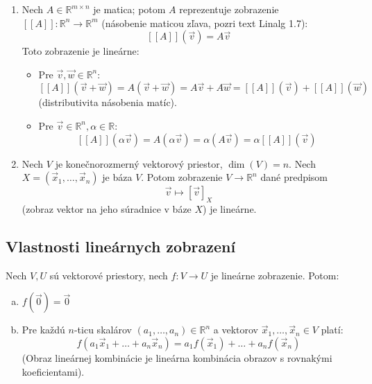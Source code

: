 \begin{priklad}
\begin{enumerate}
    \item Nech $A \in \mathbb{R}^{m \times n}$ je matica; potom $A$ reprezentuje zobrazenie $[[A]]: \mathbb{R}^n \to \mathbb{R}^m$ (násobenie maticou zľava, pozri text Linalg 1.7):
    $$ [[A]](\vec{v}) = A\vec{v} $$
    Toto zobrazenie je lineárne:
    \begin{itemize}
        \item Pre $\vec{v}, \vec{w} \in \mathbb{R}^n$:
        $$ [[A]](\vec{v} + \vec{w}) = A(\vec{v} + \vec{w}) = A\vec{v} + A\vec{w} = [[A]](\vec{v}) + [[A]](\vec{w}) $$
        (distributivita násobenia matíc).
        \item Pre $\vec{v} \in \mathbb{R}^n, \alpha \in \mathbb{R}$:
        $$ [[A]](\alpha \vec{v}) = A(\alpha \vec{v}) = \alpha (A\vec{v}) = \alpha [[A]](\vec{v}) $$
    \end{itemize}
    
    \item Nech $V$ je konečnorozmerný vektorový priestor, $\dim(V) = n$. Nech $X = (\vec{x}_1, \dots, \vec{x}_n)$ je báza $V$. Potom zobrazenie $V \to \mathbb{R}^n$ dané predpisom
    $$ \vec{v} \mapsto [\vec{v}]_X $$
    (zobraz vektor na jeho súradnice v báze $X$) je lineárne.
\end{enumerate}
\end{priklad}

\subsection{Vlastnosti lineárnych zobrazení}

\begin{veta} \label{veta:vlastnosti_linearneho_zobrazenia}
Nech $V, U$ sú vektorové priestory, nech $f: V \to U$ je lineárne zobrazenie. Potom:
\begin{enumerate}[a)]
    \item $f(\vec{0}) = \vec{0}$
    \item Pre každú $n$-ticu skalárov $(a_1, \dots, a_n) \in \mathbb{R}^n$ a vektorov $\vec{x}_1, \dots, \vec{x}_n \in V$ platí:
    $$ f(a_1 \vec{x}_1 + \dots + a_n \vec{x}_n) = a_1 f(\vec{x}_1) + \dots + a_n f(\vec{x}_n) $$
    (Obraz lineárnej kombinácie je lineárna kombinácia obrazov s rovnakými koeficientami).
\end{enumerate}
\end{veta}

